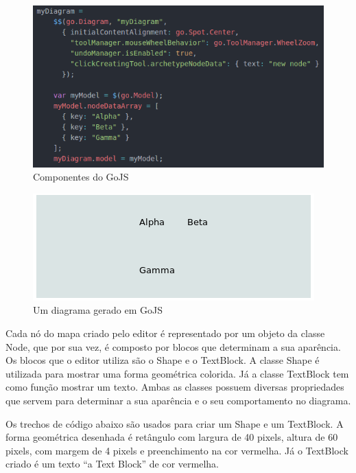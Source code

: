 \documentclass[
	12pt,				%
	openright,			%
	oneside,			%
	a4paper,			%
	english,			%
	french,				%
	spanish,			%
	brazil				%
	]{abntex2}
\begin{document}
\begin{figure}[htb]
	\caption{\label{fig_gojs} Componentes do GoJS}
	\begin{center}
		\includegraphics[scale=0.7]{gojs.png}
	\end{center}
\end{figure}

\begin{figure}[htb]
	\caption{\label{fig_diagram} Um diagrama gerado em GoJS}
	\begin{center}
		\includegraphics[scale=0.7]{diagram.png}
	\end{center}
\end{figure}

Cada nó do mapa criado pelo editor é representado por um objeto da classe Node, que por sua vez, é composto por blocos que determinam a sua aparência. Os blocos que o editor utiliza são o Shape e o TextBlock. A classe Shape é utilizada para mostrar uma forma geométrica colorida. Já a classe TextBlock tem como função mostrar um texto. Ambas as classes possuem diversas propriedades que servem para determinar a sua aparência e o seu comportamento no diagrama.

Os trechos de código abaixo são usados para criar um Shape e um TextBlock. A forma geométrica  desenhada é retângulo com largura de 40 pixels, altura de 60 pixels, com margem de 4 pixels e preenchimento na cor vermelha. Já o TextBlock criado é um texto “a Text Block” de cor vermelha.
\end{document}
